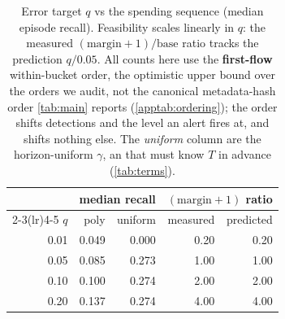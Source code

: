 \begin{table}[t]
\centering
\caption{Error target $q$ vs the spending sequence (median episode recall). Feasibility
scales linearly in $q$: the measured $(\text{margin}+1)/\text{base}$ ratio tracks the
prediction $q/0.05$. All counts here use the \textbf{first-flow} within-bucket order, the optimistic upper bound over the orders we audit, not the canonical metadata-hash order \cref{tab:main} reports (\cref{apptab:ordering}); the order shifts detections and the level an alert fires at, and shifts nothing else. The \emph{uniform} column are the horizon-uniform $\gamma$, an \oracle{} that must know $T$ in advance (\cref{tab:terms}).}
\label{apptab:qsweep}
\begin{tabular}{rrrrr}
\toprule
 & \multicolumn{2}{c}{median recall} & \multicolumn{2}{c}{$(\text{margin}+1)$ ratio} \\
\cmidrule(lr){2-3}\cmidrule(lr){4-5}
$q$ & poly & uniform & measured & predicted \\
\midrule
0.01 & 0.049 & 0.000 & 0.20 & 0.20 \\
0.05 & 0.085 & 0.273 & 1.00 & 1.00 \\
0.10 & 0.100 & 0.274 & 2.00 & 2.00 \\
0.20 & 0.137 & 0.274 & 4.00 & 4.00 \\
\bottomrule
\end{tabular}
\end{table}
